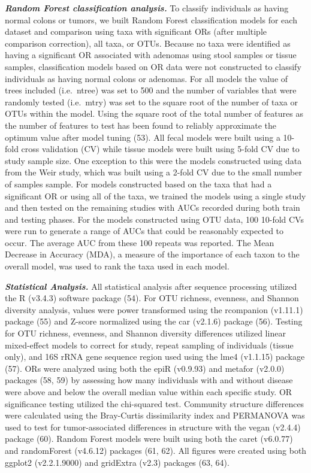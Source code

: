\documentclass[12pt,]{article}
\begin{document}
\textbf{\emph{Random Forest classification analysis.}} To classify
individuals as having normal colons or tumors, we built Random Forest
classification models for each dataset and comparison using taxa with
significant ORs (after multiple comparison correction), all taxa, or
OTUs. Because no taxa were identified as having a significant OR
associated with adenomas using stool samples or tissue samples,
classification models based on OR data were not constructed to classify
individuals as having normal colons or adenomas. For all models the
value of trees included (i.e.~ntree) was set to 500 and the number of
variables that were randomly tested (i.e.~mtry) was set to the square
root of the number of taxa or OTUs within the model. Using the square
root of the total number of features as the number of features to test
has been found to reliably approximate the optimum value after model
tuning (53). All fecal models were built using a 10-fold cross
validation (CV) while tissue models were built using 5-fold CV due to
study sample size. One exception to this were the models constructed
using data from the Weir study, which was built using a 2-fold CV due to
the small number of samples sample. For models constructed based on the
taxa that had a significant OR or using all of the taxa, we trained the
models using a single study and then tested on the remaining studies
with AUCs recorded during both train and testing phases. For the models
constructed using OTU data, 100 10-fold CVs were run to generate a range
of AUCs that could be reasonably expected to occur. The average AUC from
these 100 repeats was reported. The Mean Decrease in Accuracy (MDA), a
measure of the importance of each taxon to the overall model, was used
to rank the taxa used in each model.

\textbf{\emph{Statistical Analysis.}} All statistical analysis after
sequence processing utilized the R (v3.4.3) software package (54). For
OTU richness, evenness, and Shannon diversity analysis, values were
power transformed using the rcompanion (v1.11.1) package (55) and
Z-score normalized using the car (v2.1.6) package (56). Testing for OTU
richness, evenness, and Shannon diversity differences utilized linear
mixed-effect models to correct for study, repeat sampling of individuals
(tissue only), and 16S rRNA gene sequence region used using the lme4
(v1.1.15) package (57). ORs were analyzed using both the epiR (v0.9.93)
and metafor (v2.0.0) packages (58, 59) by assessing how many individuals
with and without disease were above and below the overall median value
within each specific study. OR significance testing utilized the
chi-squared test. Community structure differences were calculated using
the Bray-Curtis dissimilarity index and PERMANOVA was used to test for
tumor-associated differences in structure with the vegan (v2.4.4)
package (60). Random Forest models were built using both the caret
(v6.0.77) and randomForest (v4.6.12) packages (61, 62). All figures were
created using both ggplot2 (v2.2.1.9000) and gridExtra (v2.3) packages
(63, 64).
\end{document}
